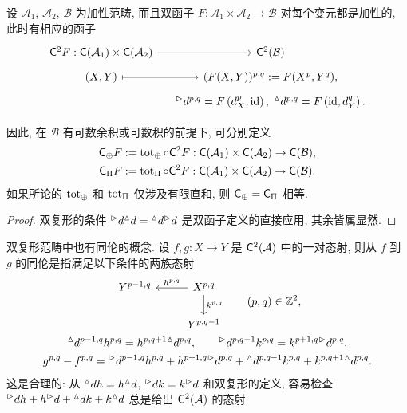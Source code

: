 \begin{definition-proposition}\label{def:bifunctor-cplx}
	设 $\mathcal{A}_1$, $\mathcal{A}_2$, $\mathcal{B}$ 为加性范畴, 而且双函子 $F: \mathcal{A}_1 \times \mathcal{A}_2 \to \mathcal{B}$ 对每个变元都是加性的, 此时有相应的函子
	\[\begin{tikzcd}[row sep=tiny, column sep=small]
		\cate{C}^2 F: \cate{C}(\mathcal{A}_1) \times \cate{C}(\mathcal{A}_2) \arrow[r] & \cate{C}^2(\mathcal{B}) \\
		(X, Y) \arrow[mapsto, r] & (F(X, Y))^{p, q} := F(X^p, Y^q), \\
		& \dhori^{p, q} = F\left( d_X^p, \identity \right), \; \dvert^{p, q} = F\left( \identity, d_Y^q\right) .
	\end{tikzcd}\]

	因此, 在 $\mathcal{B}$ 有可数余积或可数积的前提下, 可分别定义
	\begin{gather*}
		\mathsf{C}_{\oplus} F := \operatorname{tot}_{\oplus} \circ \mathsf{C}^2 F: \mathsf{C}(\mathcal{A}_1) \times \mathsf{C}(\mathcal{A}_2) \to \mathsf{C}(\mathcal{B}), \\
		\mathsf{C}_{\Pi} F := \operatorname{tot}_{\Pi} \circ \mathsf{C}^2 F: \mathsf{C}(\mathcal{A}_1) \times \mathsf{C}(\mathcal{A}_2) \to \mathsf{C}(\mathcal{B}).
	\end{gather*}
	如果所论的 $\operatorname{tot}_{\oplus}$ 和 $\operatorname{tot}_{\Pi}$ 仅涉及有限直和, 则 $\mathsf{C}_{\oplus} = \mathsf{C}_{\Pi}$ 相等.
\end{definition-proposition}
\begin{proof}
	双复形的条件 ${}^\vartriangleright d {}^\vartriangle d = {}^\vartriangle d {}^\vartriangleright d$ 是双函子定义的直接应用, 其余皆属显然.
\end{proof}

双复形范畴中也有同伦的概念. 设 $f, g: X \to Y$ 是 $\mathsf{C}^2(\mathcal{A})$ 中的一对态射, 则从 $f$ 到 $g$ 的同伦是指满足以下条件的两族态射 
\begin{equation*}\begin{gathered}\begin{tikzcd}
	Y^{p-1, q} & X^{p,q} \arrow[l, "{h^{p,q}}"'] \arrow[d, "{k^{p, q}}"] \\
	& Y^{p, q-1}
\end{tikzcd} \qquad (p,q) \in \Z^2 , \\
	\dvert^{p-1, q} h^{p, q} = h^{p, q+1} \dvert^{p, q}, \qquad \dhori^{p, q-1} k^{p,q} = k^{p+1, q} \dhori^{p,q}, \\
	g^{p,q} - f^{p, q} = \dhori^{p-1, q} h^{p,q} + h^{p+1, q} \dhori^{p,q} + \dvert^{p, q-1} k^{p,q} + k^{p, q+1} \dvert^{p,q}.
\end{gathered}\end{equation*}
这是合理的: 从 ${}^\vartriangle d h = h {}^\vartriangle d$, ${}^\vartriangleright d k = k {}^\vartriangleright d$ 和双复形的定义, 容易检查 ${}^\vartriangleright d h + h {}^\vartriangleright d + {}^\vartriangle d k + k {}^\vartriangle d$ 总是给出 $\mathsf{C}^2(\mathcal{A})$ 的态射.

